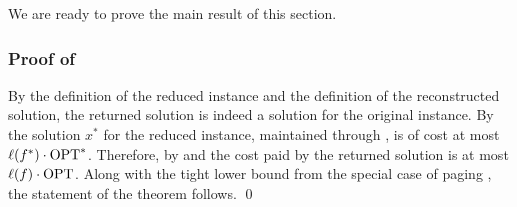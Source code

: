 \documentclass[11pt]{article}
\newcommand{\OPT}{\textnormal{OPT}}
\begin{document}
{%


We are ready to prove the main result of this section. 
\subsubsection*{Proof of }
By the definition of the reduced instance and the definition of the reconstructed solution, the returned solution is indeed a solution for the original instance. By  the solution $x^*$ for the reduced instance, maintained through , is of cost at most $\ell(f^*) \cdot \OPT^*$. Therefore, by  and  the cost paid by the returned solution is at most $\ell(f) \cdot \OPT$. 
Along with the tight lower bound from the special case of paging \cite{sleator1985amortized}, the statement of the theorem follows. %
\qed


}







\end{document}
